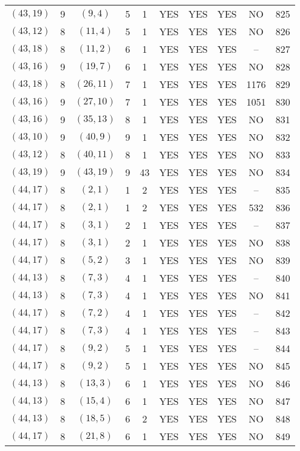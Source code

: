 \begin{longtable}{|c|c|c|c|c|c|c|c|c|c|}
$(43, 19)$ & 9 & $(9, 4)$ & 5 & 1 & YES & YES & YES & NO & 825\\
$(43, 12)$ & 8 & $(11, 4)$ & 5 & 1 & YES & YES & YES & NO & 826\\
$(43, 18)$ & 8 & $(11, 2)$ & 6 & 1 & YES & YES & YES & -- & 827\\
$(43, 16)$ & 9 & $(19, 7)$ & 6 & 1 & YES & YES & YES & NO & 828\\
$(43, 18)$ & 8 & $(26, 11)$ & 7 & 1 & YES & YES & YES & 1176 & 829\\
$(43, 16)$ & 9 & $(27, 10)$ & 7 & 1 & YES & YES & YES & 1051 & 830\\
$(43, 16)$ & 9 & $(35, 13)$ & 8 & 1 & YES & YES & YES & NO & 831\\
$(43, 10)$ & 9 & $(40, 9)$ & 9 & 1 & YES & YES & YES & NO & 832\\
$(43, 12)$ & 8 & $(40, 11)$ & 8 & 1 & YES & YES & YES & NO & 833\\
$(43, 19)$ & 9 & $(43, 19)$ & 9 & 43 & YES & YES & YES & NO & 834\\
$(44, 17)$ & 8 & $(2, 1)$ & 1 & 2 & YES & YES & YES & -- & 835\\
$(44, 17)$ & 8 & $(2, 1)$ & 1 & 2 & YES & YES & YES & 532 & 836\\
$(44, 17)$ & 8 & $(3, 1)$ & 2 & 1 & YES & YES & YES & -- & 837\\
$(44, 17)$ & 8 & $(3, 1)$ & 2 & 1 & YES & YES & YES & NO & 838\\
$(44, 17)$ & 8 & $(5, 2)$ & 3 & 1 & YES & YES & YES & NO & 839\\
$(44, 13)$ & 8 & $(7, 3)$ & 4 & 1 & YES & YES & YES & -- & 840\\
$(44, 13)$ & 8 & $(7, 3)$ & 4 & 1 & YES & YES & YES & NO & 841\\
$(44, 17)$ & 8 & $(7, 2)$ & 4 & 1 & YES & YES & YES & -- & 842\\
$(44, 17)$ & 8 & $(7, 3)$ & 4 & 1 & YES & YES & YES & -- & 843\\
$(44, 17)$ & 8 & $(9, 2)$ & 5 & 1 & YES & YES & YES & -- & 844\\
$(44, 17)$ & 8 & $(9, 2)$ & 5 & 1 & YES & YES & YES & NO & 845\\
$(44, 13)$ & 8 & $(13, 3)$ & 6 & 1 & YES & YES & YES & NO & 846\\
$(44, 13)$ & 8 & $(15, 4)$ & 6 & 1 & YES & YES & YES & NO & 847\\
$(44, 13)$ & 8 & $(18, 5)$ & 6 & 2 & YES & YES & YES & NO & 848\\
$(44, 17)$ & 8 & $(21, 8)$ & 6 & 1 & YES & YES & YES & NO & 849\\

\end{longtable}
